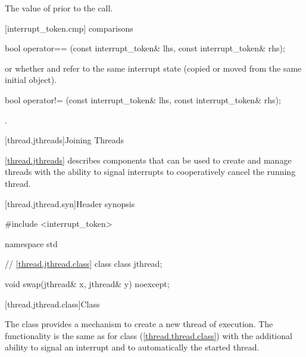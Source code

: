 {\begin{itemdescr}
  \pnum\postconditions {}

  \pnum\returns The value of  prior to the call.
\end{itemdescr}


[interrupt_token.cmp]{ comparisons}

%
\begin{itemdecl}
bool operator== (const interrupt_token& lhs, const interrupt_token& rhs);
\end{itemdecl}
\begin{itemdescr}
  \pnum\returns {} or
                whether  and  refer to the
                same interrupt state
                (copied or moved from the same initial  object).
\end{itemdescr}

%
\begin{itemdecl}
bool operator!= (const interrupt_token& lhs, const interrupt_token& rhs);
\end{itemdecl}
\begin{itemdescr}
  \pnum\returns {}.
\end{itemdescr}


\clearpage

[thread.jthreads]{Joining Threads}


\pnum
\ref{thread.jthreads} describes components that can be used to create and manage threads
with the ability to signal interrupts to cooperatively cancel the running thread.

[thread.jthread.syn]{Header  synopsis}
%

\begin{codeblock}
#include <interrupt_token>

namespace std {
  // \ref{thread.jthread.class} class 
  class jthread;

  void swap(jthread& x, jthread& y) noexcept;
}
\end{codeblock}


[thread.jthread.class]{Class }

\pnum
The class  provides a mechanism
to create a new thread of execution.
The functionality is the same as for class  (\ref{thread.thread.class})
with the additional ability to signal an interrupt and to
automatically  the started thread.

}
